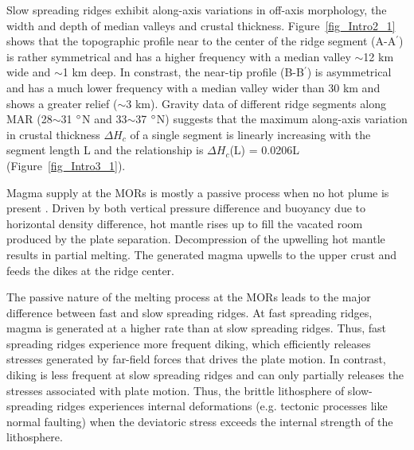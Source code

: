 Slow spreading ridges exhibit along-axis variations in off-axis morphology, the width and depth of median valleys and crustal thickness.  Figure~\ref{fig_Intro2_1} shows that the topographic profile near to the center of the ridge segment (A-A$^{\prime}$) is rather symmetrical and has a higher frequency with a median valley $\sim$12 km wide and $\sim$1 km deep. In constrast, the near-tip profile (B-B$^{\prime}$) is asymmetrical and has a much lower frequency with a median valley wider than 30 km and shows a greater relief ($\sim$3 km). Gravity data of different ridge segments along MAR (28$\sim$31 $\degree$N and 33$\sim$37 $\degree$N) suggests that the maximum along-axis variation in crustal thickness $\Delta H_{c}$ of a single segment is linearly increasing with the segment length L \citep{Chen1999} and the relationship is $\Delta H_{c}$(L) = 0.0206L (Figure~\ref{fig_Intro3_1}).


%

Magma supply at the MORs is mostly a passive process when no hot plume is present \citep{Fowler2004}. Driven by both vertical pressure difference and buoyancy due to horizontal density difference, hot mantle rises up to fill the vacated room produced by the plate separation. Decompression of the upwelling hot mantle results in partial melting. The generated magma upwells to the upper crust and feeds the dikes at the ridge center. %

The passive nature of the melting process at the MORs leads to the major difference between fast and slow spreading ridges. At fast spreading ridges, magma is generated at a higher rate than at slow spreading ridges. Thus, fast spreading ridges experience more frequent diking, which efficiently releases stresses generated by far-field forces that drives the plate motion. In contrast, diking is less frequent at slow spreading ridges and can only partially releases the stresses associated with plate motion. Thus, the brittle lithosphere of slow-spreading ridges experiences internal deformations (e.g. tectonic processes like normal faulting) when the deviatoric stress exceeds the internal strength of the lithosphere.


